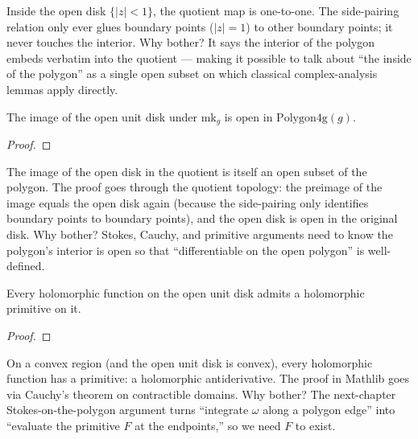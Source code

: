 \begin{layman}
Inside the open disk \(\{|z|<1\}\), the quotient map is one-to-one.
The side-pairing relation only ever glues boundary points
(\(|z|=1\)) to other boundary points; it never touches the interior.
Why bother? It says the interior of the polygon embeds verbatim
into the quotient — making it possible to talk about ``the inside
of the polygon'' as a single open subset on which classical
complex-analysis lemmas apply directly.
\end{layman}

\begin{lemma}
\label{lem:mk-image-openDisk-isOpen}
The image of the open unit disk under \(\mathrm{mk}_g\) is open in
\(\mathrm{Polygon4g}(g)\).
\leanok
\end{lemma}
\begin{proof}\leanok\end{proof}

\begin{layman}
The image of the open disk in the quotient is itself an open subset
of the polygon. The proof goes through the quotient topology:
the preimage of the image equals the open disk again (because the
side-pairing only identifies boundary points to boundary points), and
the open disk is open in the original disk. Why bother? Stokes,
Cauchy, and primitive arguments need to know the polygon's
interior is open so that ``differentiable on the open polygon''
is well-defined.
\end{layman}

\begin{lemma}
\label{lem:holomorphic-primitive-openDisk}
Every holomorphic function on the open unit disk admits a holomorphic
primitive on it.
\leanok
\end{lemma}
\begin{proof}\leanok\end{proof}

\begin{layman}
On a convex region (and the open unit disk is convex), every
holomorphic function has a primitive: a holomorphic antiderivative.
The proof in Mathlib goes via Cauchy's theorem on contractible
domains. Why bother? The next-chapter Stokes-on-the-polygon
argument turns ``integrate \(\omega\) along a polygon edge'' into
``evaluate the primitive \(F\) at the endpoints,'' so we need
\(F\) to exist.
\end{layman}

